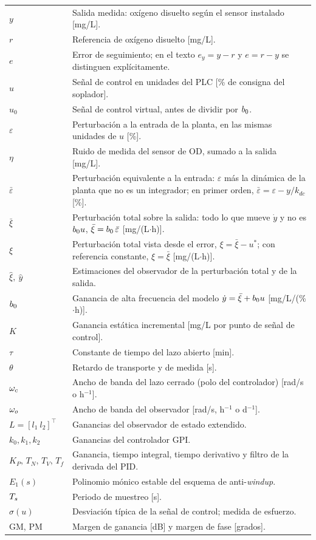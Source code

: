 \begin{longtable}{p{2.6cm}p{12.5cm}}
$y$ & Salida medida: oxígeno disuelto según el sensor instalado [mg/L]. \\
$r$ & Referencia de oxígeno disuelto [mg/L]. \\
$e$ & Error de seguimiento; en el texto $e_y = y-r$ y $e = r-y$ se distinguen explícitamente. \\
$u$ & Señal de control en unidades del PLC [\% de consigna del soplador]. \\
$u_0$ & Señal de control virtual, antes de dividir por $b_{0}$. \\
$\varepsilon$ & Perturbación a la entrada de la planta, en las mismas unidades de $u$ [\%]. \\
$\eta$ & Ruido de medida del sensor de OD, sumado a la salida [mg/L]. \\
$\bar{\varepsilon}$ & Perturbación equivalente a la entrada: $\varepsilon$ más la dinámica de la planta que no es un integrador; en primer orden, $\bar{\varepsilon} = \varepsilon - y/k_{dc}$ [\%]. \\
$\bar{\xi}$ & Perturbación total sobre la salida: todo lo que mueve $\dot y$ y no es $b_{0} u$, $\bar{\xi} = b_{0}\,\bar{\varepsilon}$ [mg/(L$\cdot$h)]. \\
$\xi$ & Perturbación total vista desde el error, $\xi = \bar{\xi} - u^*$; con referencia constante, $\xi = \bar{\xi}$ [mg/(L$\cdot$h)]. \\
$\hat{\xi},\ \hat{y}$ & Estimaciones del observador de la perturbación total y de la salida. \\
$b_{0}$ & Ganancia de alta frecuencia del modelo $\dot y=\bar{\xi}+b_{0} u$ [mg/L/(\%$\cdot$h)]. \\
$K$ & Ganancia estática incremental [mg/L por punto de señal de control]. \\
$\tau$ & Constante de tiempo del lazo abierto [min]. \\
$\theta$ & Retardo de transporte y de medida [s]. \\
$\omega_{c}$ & Ancho de banda del lazo cerrado (polo del controlador) [rad/s o h$^{-1}$]. \\
$\omega_{o}$ & Ancho de banda del observador [rad/s, h$^{-1}$ o d$^{-1}$]. \\
$L=[l_1\ l_2]^{\!\top}$ & Ganancias del observador de estado extendido. \\
$k_0,k_1,k_2$ & Ganancias del controlador GPI. \\
$K_P,\,T_N,\,T_V,\,T_f$ & Ganancia, tiempo integral, tiempo derivativo y filtro de la derivada del PID. \\
$E_1(s)$ & Polinomio mónico estable del esquema de anti-\emph{windup}. \\
$T_{s}$ & Periodo de muestreo [s]. \\
$\sigma(u)$ & Desviación típica de la señal de control; medida de esfuerzo. \\
GM, PM & Margen de ganancia [dB] y margen de fase [grados]. \\
\end{longtable}
